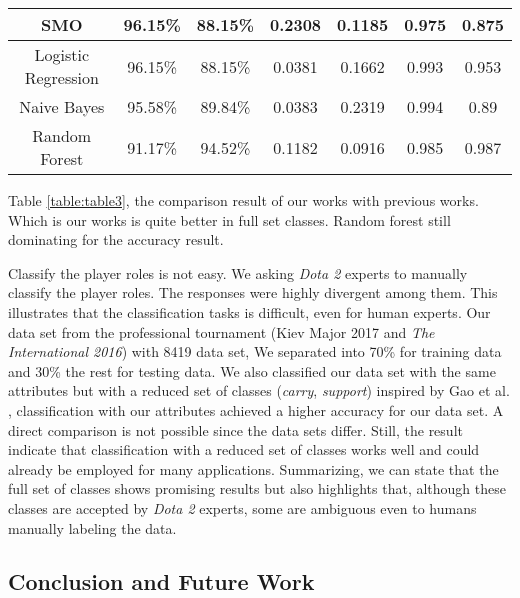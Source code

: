 \begin{table}[]
{\begin{tabular}{|c|c|c|c|c|c|c|}
SMO                             & 96.15\%            & 88.15\%           & 0.2308                  & 0.1185                  & 0.975                & 0.875                \\ \hline
Logistic Regression             & 96.15\%            & 88.15\%           & 0.0381                  & 0.1662                  & 0.993                & 0.953                \\ \hline
Naive Bayes                     & 95.58\%            & 89.84\%           & 0.0383                  & 0.2319                  & 0.994                & 0.89                 \\ \hline
Random Forest                   & 91.17\%            & 94.52\%           & 0.1182                  & 0.0916                  & 0.985                & 0.987                \\ \hline
\end{tabular}%
}
\end{table}

Table \ref{table:table3}, the comparison result of our works with previous works. Which is our works is quite better in full set classes. Random forest still dominating for the accuracy result.

Classify the player roles is not easy. We asking \textit{Dota 2} experts to manually classify the player roles. The responses were highly divergent among them. This illustrates that the classification tasks is difficult, even for human experts. Our data set from the professional tournament (Kiev Major 2017 and \textit{The International 2016}) with 8419 data set, We separated into 70\% for training data and 30\% the rest for testing data. We also classified our data set with the same attributes but with a reduced set of classes (\textit{carry}, \textit{support}) inspired by Gao et al. \cite{gao2013classifying}, classification with our attributes achieved a higher accuracy for our data set. A direct comparison is not possible since the data sets differ. Still, the result indicate that classification with a reduced set of classes works well and could already be employed for many applications. Summarizing, we can state that the full set of classes shows promising results but also highlights that, although these classes are accepted by \textit{Dota 2} experts, some are ambiguous even to humans manually labeling the data.

\subsection{Conclusion and Future Work}
\label{sec:conclusion}

